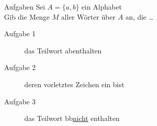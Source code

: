 \begin{frame}{Aufgaben}
	Sei $A=\{a,b\}$ ein Alphabet\\
	Gib die Menge $M$ aller Wörter über $A$ an, die \dots\\
	\begin{description}
		\item[Aufgabe 1] das Teilwort \frqq ab\flqq enthalten
		\item[Aufgabe 2] deren vorletztes Zeichen ein \frqq b\flqq ist
		\item[Aufgabe 3] das Teilwort \frqq bb\flqq \thinspace \underline{nicht} enthalten
	\end{description}
	\\
\end{frame}
